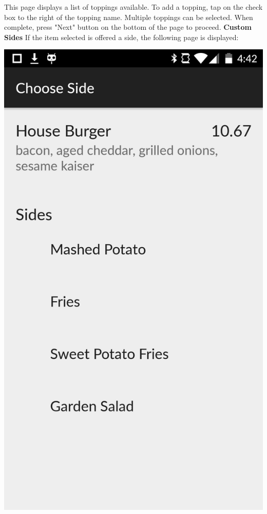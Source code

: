 \documentclass[12pt, titlepage]{article}
\begin{document}
This page displays a list of toppings available. To add a topping, tap on the check box to the right of the topping name. Multiple toppings can be selected. When complete, press "Next" button on the bottom of the page to proceed.\pagebreak
\newline
\textbf{Custom Sides}\newline
If the item selected is offered a side, the following page is displayed:
\begin{center}\includegraphics[scale=0.15]{sides.png}\end{center}
\end{document}
